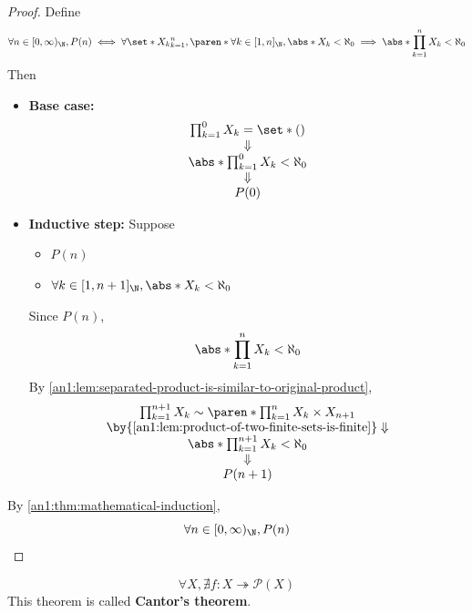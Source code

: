 \begin{proof}
  Define
  \[
    \forall n \in [0, \infty)_{\N}, P(n) \iff \forall \set*{X_{k}}_{k = 1}^{n}, \paren*{\forall k \in [1, n]_{\N},
      \abs*{X_{k}} < \aleph_{0}} \implies \abs*{\prod_{k = 1}^{n} X_{k}} < \aleph_{0}
  \]
  Then
  \begin{itemize}
    \item \textbf{Base case:}
          \[
            \begin{array}{c}
              \prod_{k = 1}^{0} X_{k} = \set*{()}         \\
              \Downarrow                                  \\
              \abs*{\prod_{k = 1}^{0} X_{k}} < \aleph_{0} \\
              \Downarrow                                  \\
              P(0)
            \end{array}
          \]
    \item \textbf{Inductive step:} Suppose
          \begin{itemize}
            \item $P(n)$
            \item $\forall k \in [1, n + 1]_{\N}, \abs*{X_{k}} < \aleph_{0}$
          \end{itemize}
          Since $P(n)$,
          \[
            \abs*{\prod_{k = 1}^{n} X_{k}} < \aleph_{0}
          \]
          By \cref{an1:lem:separated-product-is-similar-to-original-product},
          \[
            \begin{array}{c}
              \prod_{k = 1}^{n + 1} X_{k} \sim \paren*{\prod_{k = 1}^{n} X_{k}} \times X_{n + 1} \\
              \by{\Cref{an1:lem:product-of-two-finite-sets-is-finite}} \Downarrow                \\
              \abs*{\prod_{k = 1}^{n + 1} X_{k}} < \aleph_{0}                                    \\
              \Downarrow                                                                         \\
              P(n + 1)
            \end{array}
          \]
  \end{itemize}
  By \cref{an1:thm:mathematical-induction},
  \[
    \forall n \in [0, \infty)_{\N}, P(n)
  \]
\end{proof}

\begin{theorem} \label{an1:thm:cantors-theorem}
  \[
    \forall X, \nexists f: X \twoheadrightarrow \mathcal{P}(X)
  \]
  This theorem is called \textbf{Cantor's theorem}.
\end{theorem}

